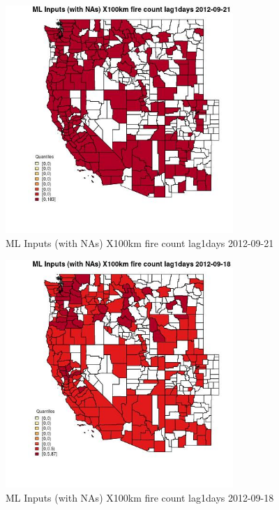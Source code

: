 \begin{figure} 
\centering  
\includegraphics[width=0.77\textwidth]{Code_Outputs/Report_ML_input_PM25_Step4_part_e_de_duplicated_aves_compiled_2019-05-14wNAs_CountyX100km_fire_count_lag1daysMean2012-09-21_2012-09-21.jpg} 
\caption{\label{fig:Report_ML_input_PM25_Step4_part_e_de_duplicated_aves_compiled_2019-05-14wNAsCountyX100km_fire_count_lag1daysMean2012-09-21_2012-09-21}ML Inputs (with NAs) X100km fire count lag1days 2012-09-21} 
\end{figure} 
 

\begin{figure} 
\centering  
\includegraphics[width=0.77\textwidth]{Code_Outputs/Report_ML_input_PM25_Step4_part_e_de_duplicated_aves_compiled_2019-05-14wNAs_CountyX100km_fire_count_lag1daysMean2012-09-18_2012-09-18.jpg} 
\caption{\label{fig:Report_ML_input_PM25_Step4_part_e_de_duplicated_aves_compiled_2019-05-14wNAsCountyX100km_fire_count_lag1daysMean2012-09-18_2012-09-18}ML Inputs (with NAs) X100km fire count lag1days 2012-09-18} 
\end{figure} 
 

